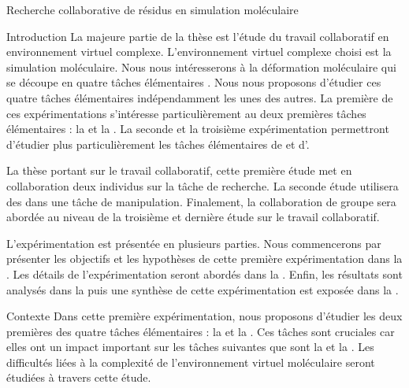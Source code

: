 \documentclass[myfrancais]{mythesis}
\begin{document}
	\begin{mychapter}{Recherche collaborative de résidus en simulation moléculaire}
		\begin{mysection}{Introduction}
			La majeure partie de la thèse est l'étude du travail collaboratif en environnement virtuel complexe.
			L'environnement virtuel complexe choisi est la simulation moléculaire.
			Nous nous intéresserons à la déformation moléculaire qui se découpe en quatre tâches élémentaires .
			Nous nous proposons d'étudier ces quatre tâches élémentaires indépendamment les unes des autres.
			La première de ces expérimentations s'intéresse particulièrement au deux premières tâches élémentaires : la  et la .
			La seconde et la troisième expérimentation permettront d'étudier plus particulièrement les tâches élémentaires de  et d'.

			La thèse portant sur le travail collaboratif, cette première étude met en collaboration deux individus sur la tâche de recherche.
			La seconde étude utilisera des  dans une tâche de manipulation.
			Finalement, la collaboration de groupe sera abordée au niveau de la troisième et dernière étude sur le travail collaboratif.

			L'expérimentation est présentée en plusieurs parties.
			Nous commencerons par présenter les objectifs et les hypothèses de cette première expérimentation dans la .
			Les détails de l'expérimentation seront abordés dans la .
			Enfin, les résultats sont analysés dans la  puis une synthèse de cette expérimentation est exposée dans la .
		\end{mysection}
		\begin{mysection}{Contexte}
			Dans cette première expérimentation, nous proposons d'étudier les deux premières des quatre tâches élémentaires : la  et la .
			Ces tâches sont cruciales car elles ont un impact important sur les tâches suivantes que sont la  et la .
			Les difficultés liées à la complexité de l'environnement virtuel moléculaire seront étudiées à travers cette étude.


\end{mysection}
\end{mychapter}
\end{document}
